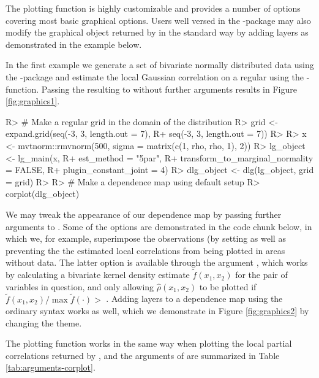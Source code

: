 The plotting function is highly customizable and provides a number of options covering most basic graphical options. Users well versed in the -package may also modify the graphical object returned by  in the standard way by adding layers as demonstrated in the example below.

In the first example we generate a set of bivariate normally distributed data using the -package \citep{gentz:etal:2018} and estimate the local Gaussian correlation on a regular  using the -function. Passing the resulting  to  without further arguments results in Figure \ref{fig:graphics1}.

\begin{example}
R> # Make a regular grid in the domain of the distribution
R> grid <- expand.grid(seq(-3, 3, length.out = 7),
R+                     seq(-3, 3, length.out = 7))
R> 
R> x <- mvtnorm::rmvnorm(500, sigma = matrix(c(1, rho, rho, 1), 2))
R> lg_object <- lg_main(x, 
R+                      est_method = "5par", 
R+                      transform_to_marginal_normality = FALSE,
R+                      plugin_constant_joint = 4)
R> dlg_object <- dlg(lg_object, grid = grid)
R> 
R> # Make a dependence map using default setup
R> corplot(dlg_object)
\end{example}


We may tweak the appearance of our dependence map by passing further arguments to . Some of the options are demonstrated in the code chunk below, in which we, for example, superimpose the observations (by setting  as well as preventing the the estimated local correlations from being plotted in areas without data. The latter option is available through the argument , which works by calculating a bivariate kernel density estimate \(\tilde f(x_1, x_2)\) for the pair of  variables in question, and only allowing \(\widehat \rho(x_1,x_2)\) to be plotted if \(\tilde f(x_1,x_2)/\max\tilde f(\cdot) >\) . Adding layers to a dependence map using the ordinary  syntax works as well, which we demonstrate in Figure \ref{fig:graphics2} by changing the  theme.

The plotting function works in the same way when plotting the local partial correlations returned by , and the arguments of  are summarized in Table \ref{tab:arguments-corplot}.

